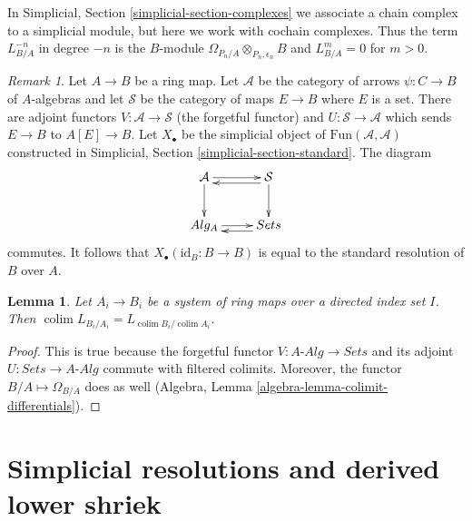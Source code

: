 \documentclass{stacks-project}
\theoremstyle{plain}
\newtheorem{lemma}[subsection]{Lemma}
\theoremstyle{definition}
\theoremstyle{remark}
\newtheorem{remark}[subsection]{Remark}
\numberwithin{equation}{subsection}
\def\colim{\mathop{\mathrm{colim}}\nolimits}
\begin{document}
\noindent
In Simplicial, Section \ref{simplicial-section-complexes} we associate a
chain complex to a simplicial module, but here we work with cochain complexes.
Thus the term $L_{B/A}^{-n}$ in degree $-n$ is the $B$-module
$\Omega_{P_n/A} \otimes_{P_n, \epsilon_n} B$ and $L_{B/A}^m = 0$
for $m > 0$.

\begin{remark}
\label{remark-variant-cotangent-complex}
Let $A \to B$ be a ring map. Let $\mathcal{A}$ be the category of
arrows $\psi : C \to B$ of $A$-algebras and let $\mathcal{S}$ be
the category of maps $E \to B$ where $E$ is a set. There are adjoint
functors $V : \mathcal{A} \to \mathcal{S}$ (the forgetful functor)
and $U : \mathcal{S} \to \mathcal{A}$ which sends $E \to B$ to
$A[E] \to B$. Let $X_\bullet$ be the simplicial object of
$\text{Fun}(\mathcal{A}, \mathcal{A})$ constructed in
Simplicial, Section \ref{simplicial-section-standard}.
The diagram
$$
\xymatrix{
\mathcal{A} \ar[d] \ar[r] & \mathcal{S} \ar@<1ex>[l] \ar[d] \\
\textit{Alg}_A \ar[r] & \textit{Sets} \ar@<1ex>[l]
}
$$
commutes. It follows that $X_\bullet(\text{id}_B : B \to B)$
is equal to the standard resolution of $B$ over $A$.
\end{remark}

\begin{lemma}
\label{lemma-colimit-cotangent-complex}
Let $A_i \to B_i$ be a system of ring maps over a directed index
set $I$. Then $\colim L_{B_i/A_i} = L_{\colim B_i/\colim A_i}$.
\end{lemma}

\begin{proof}
This is true because the forgetful functor
$V : A\textit{-Alg} \to \textit{Sets}$ and its adjoint
$U : \textit{Sets} \to A\textit{-Alg}$ commute with filtered colimits.
Moreover, the functor $B/A \mapsto \Omega_{B/A}$ does as well
(Algebra, Lemma \ref{algebra-lemma-colimit-differentials}).
\end{proof}





\section{Simplicial resolutions and derived lower shriek}
\label{section-compute-L-pi-shriek}
\end{document}
